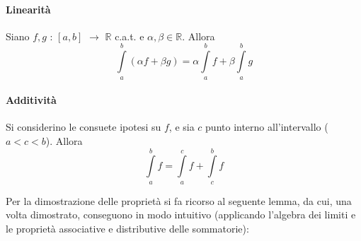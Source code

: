 \documentclass[10pt]{article}
\theoremstyle{plain}
\begin{document}
\paragraph{Linearità}
Siano $f,g$ : $[a,b]$ $\rightarrow$ $\mathbb{R}$ c.a.t. e $\alpha, \beta \in \mathbb{R}$. Allora
\[\int\limits_{a}^{b} (\alpha f + \beta g) = \alpha \int\limits_{a}^{b} f + \beta \int\limits_{a}^{b} g\]

\paragraph{Additività}
Si considerino le consuete ipotesi su $f$, e sia $c$ punto interno all'intervallo ($a < c < b$). Allora
\[\int\limits_{a}^{b} f = \int\limits_{a}^{c} f + \int\limits_{c}^{b} f\]

Per la dimostrazione delle proprietà si fa ricorso al seguente lemma, da cui, una volta dimostrato, conseguono in modo intuitivo (applicando l'algebra dei limiti e le proprietà associative e distributive delle sommatorie):
\end{document}

